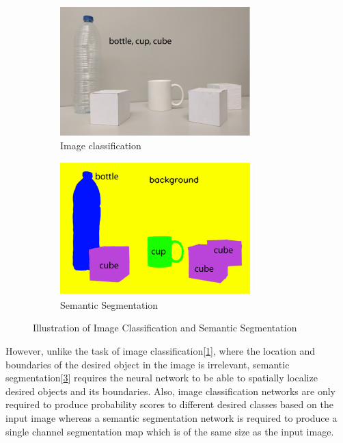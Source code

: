 \documentclass[a4paper,12pt]{article}
\begin{document}
\begin{center}
	\begin{figure}[!htb]
		\begin{subfigure}{.5\textwidth}
			\centering
			\includegraphics[width=.7\linewidth]{image_classification.png}
			\caption{Image classification}
			\label{Fig:1a}
		\end{subfigure}
		\begin{subfigure}{.5\textwidth}
			\centering
			\includegraphics[width=.7\linewidth]{semantic_segmentation.png}
			\caption{Semantic Segmentation}
			\label{Fig:1b}
		\end{subfigure}
		\caption{Illustration of Image Classification and Semantic Segmentation\cite{5}}
	\end{figure}
\end{center}

However, unlike the task of image classification[\ref{Fig:1a}], where the location and boundaries of the desired object in the image is irrelevant, semantic segmentation[\ref{Fig:1b}] requires the neural network to be able to spatially localize desired objects and its boundaries. Also, image classification networks are only required to produce probability scores to different desired classes based on the input image whereas a semantic segmentation network is required to produce a single channel segmentation map which is of the same size as the input image.\\
\end{document}
